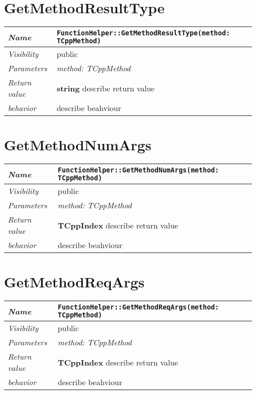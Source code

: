  \section{GetMethodResultType}
\begin{longtable}{p{3cm} @{\hskip 1cm} p{12cm}}
 \hline
\textit{Name} & \texttt{FunctionHelper::GetMethodResultType(method: TCppMethod)}\\
\hline
 \textit{Visibility} & public\\
\hline
\textit{Parameters} & \textit{method: TCppMethod}\\
\hline
\textit{Return value} & \textbf{ string} describe return value\\
  \hline
 \textit{behavior} & describe beahviour \\
\hline
\end{longtable} \pagebreak
 \section{GetMethodNumArgs}
\begin{longtable}{p{3cm} @{\hskip 1cm} p{12cm}}
 \hline
\textit{Name} & \texttt{FunctionHelper::GetMethodNumArgs(method: TCppMethod)}\\
\hline
 \textit{Visibility} & public\\
\hline
\textit{Parameters} & \textit{method: TCppMethod}\\
\hline
\textit{Return value} & \textbf{ TCppIndex} describe return value\\
  \hline
 \textit{behavior} & describe beahviour \\
\hline
\end{longtable} \pagebreak
 \section{GetMethodReqArgs}
\begin{longtable}{p{3cm} @{\hskip 1cm} p{12cm}}
 \hline
\textit{Name} & \texttt{FunctionHelper::GetMethodReqArgs(method: TCppMethod)}\\
\hline
 \textit{Visibility} & public\\
\hline
\textit{Parameters} & \textit{method: TCppMethod}\\
\hline
\textit{Return value} & \textbf{ TCppIndex} describe return value\\
  \hline
 \textit{behavior} & describe beahviour \\
\hline
\end{longtable} \pagebreak
